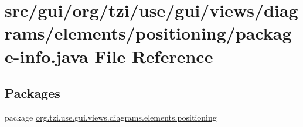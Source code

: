 \hypertarget{positioning_2package-info_8java}{\section{src/gui/org/tzi/use/gui/views/diagrams/elements/positioning/package-\/info.java File Reference}
\label{positioning_2package-info_8java}
}
\subsection*{Packages}
\begin{DoxyCompactItemize}
\item 
package \hyperlink{namespaceorg_1_1tzi_1_1use_1_1gui_1_1views_1_1diagrams_1_1elements_1_1positioning}{org.\-tzi.\-use.\-gui.\-views.\-diagrams.\-elements.\-positioning}
\end{DoxyCompactItemize}
